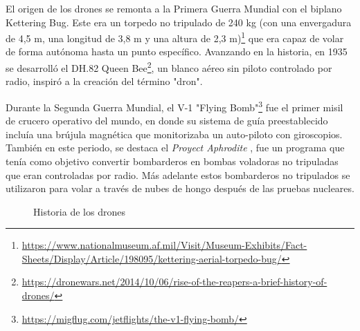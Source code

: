 El origen de los drones se remonta a la Primera Guerra Mundial con el biplano Kettering Bug.
Este era un torpedo no tripulado de 240 kg (con una envergadura de 4,5 m, una longitud de
3,8 m y una altura de 2,3 m)\footnote{\url{https://www.nationalmuseum.af.mil/Visit/Museum-Exhibits/Fact-Sheets/Display/Article/198095/kettering-aerial-torpedo-bug/}} que era capaz 
de volar de forma autónoma hasta un punto específico. 
Avanzando en la historia, en 1935 se desarrolló el DH.82 Queen Bee\footnote{\url{https://dronewars.net/2014/10/06/rise-of-the-reapers-a-brief-history-of-drones/}}, un blanco aéreo
sin piloto controlado por radio, inspiró a la creación del término "dron". 

Durante la Segunda Guerra Mundial, el V-1 "Flying Bomb"\footnote{\url{https://migflug.com/jetflights/the-v1-flying-bomb/}} fue el primer misil
de crucero operativo del mundo, en donde su sistema de guía preestablecido incluía una brújula magnética que monitorizaba un auto-piloto con giroscopios. También en este periodo, se destaca el \textit{Proyect Aphrodite} \cite{Aphrodite}, 
fue un programa que tenía como objetivo convertir bombarderos en bombas voladoras no tripuladas que eran controladas por radio. Más adelante estos bombarderos no tripulados se utilizaron para volar a través de nubes de hongo
después de las pruebas nucleares. 

\begin{figure}[H]
  \begin{center}
  \caption{Historia de los drones}
  \label{f:Drones}
  \vspace{-1.5em}
  \end{center}
 \end{figure}

